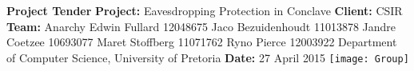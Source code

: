 \begin{titlepage}
	\begin{center}
		\large{\textbf{Project Tender}}\newline
		\vfill
		\LARGE{\textbf{Project:} Eavesdropping Protection in Conclave}\newline
		\textbf{Client:} CSIR\newline
		\vfill
		\LARGE{\textbf{Team:} Anarchy}\newline
		\large{Edwin Fullard 12048675}\newline
		\large{Jaco Bezuidenhoudt 11013878}\newline
		\large{Jandre Coetzee 10693077}\newline
		\large{Maret Stoffberg 11071762}\newline
		\large{Ryno Pierce 12003922}\newline
		\small{Department of Computer Science, University of Pretoria}\newline
		\vfill
		\large{\textbf{Date:} 27 April 2015}
		\vfill
		\texttt{[image: Group]}
	\end{center}
\end{titlepage}
